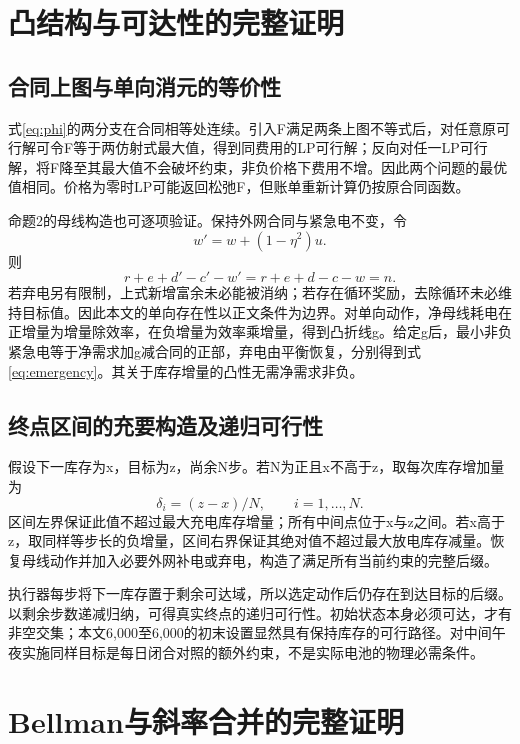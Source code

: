 \section{凸结构与可达性的完整证明}
\subsection{合同上图与单向消元的等价性}
式\eqref{eq:phi}的两分支在合同相等处连续。引入F满足两条上图不等式后，对任意原可行解可令F等于两仿射式最大值，得到同费用的LP可行解；反向对任一LP可行解，将F降至其最大值不会破坏约束，非负价格下费用不增。因此两个问题的最优值相同。价格为零时LP可能返回松弛F，但账单重新计算仍按原合同函数。

命题2的母线构造也可逐项验证。保持外网合同与紧急电不变，令
\begin{equation}
 w'=w+(1-\eta^2)u.
\end{equation}
则
\begin{equation}
 r+e+d'-c'-w'=r+e+d-c-w=n.
\end{equation}
若弃电另有限制，上式新增富余未必能被消纳；若存在循环奖励，去除循环未必维持目标值。因此本文的单向存在性以正文条件为边界。对单向动作，净母线耗电在正增量为增量除效率，在负增量为效率乘增量，得到凸折线g。给定g后，最小非负紧急电等于净需求加g减合同的正部，弃电由平衡恢复，分别得到式\eqref{eq:emergency}。其关于库存增量的凸性无需净需求非负。

\subsection{终点区间的充要构造及递归可行性}
假设下一库存为x，目标为z，尚余N步。若N为正且x不高于z，取每次库存增加量为
\begin{equation}
 \delta_i=(z-x)/N,\qquad i=1,\ldots,N.
\end{equation}
区间左界保证此值不超过最大充电库存增量；所有中间点位于x与z之间。若x高于z，取同样等步长的负增量，区间右界保证其绝对值不超过最大放电库存减量。恢复母线动作并加入必要外网补电或弃电，构造了满足所有当前约束的完整后缀。

执行器每步将下一库存置于剩余可达域，所以选定动作后仍存在到达目标的后缀。以剩余步数递减归纳，可得真实终点的递归可行性。初始状态本身必须可达，才有非空交集；本文6,000至6,000的初末设置显然具有保持库存的可行路径。对中间午夜实施同样目标是每日闭合对照的额外约束，不是实际电池的物理必需条件。

\section{Bellman与斜率合并的完整证明}
